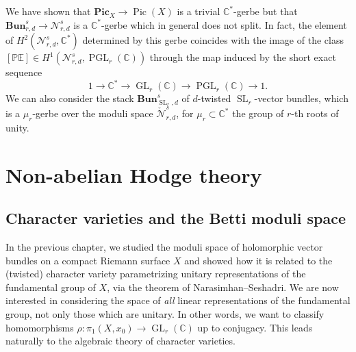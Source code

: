 \documentclass[12pt,a4paper]{amsbook}
\theoremstyle{remark} \newtheorem{rmk}[thm]{Remark}
\theoremstyle{definition} \newtheorem{defn}[thm]{Definition}
\theoremstyle{definition} \newtheorem{ex}[thm]{Example}
\theoremstyle{definition} \newtheorem{ej}{Exercise}
\newcommand{\C}{\mathbb C}
\newcommand{\bbE}{\mathbb E}
\newcommand{\bbP}{\mathbb P}
\newcommand{\cN}{\mathcal N}
\DeclareMathOperator{\Pic}{Pic}
\DeclareMathOperator{\GL}{GL}
\DeclareMathOperator{\SL}{SL}
\DeclareMathOperator{\PGL}{PGL}
\begin{document}
We have shown that $\mathbf{Pic}_X\rightarrow \Pic(X)$ is a trivial $\C^*$-gerbe but that $\mathbf{Bun}_{r,d}^s \rightarrow \cN^s_{r,d}$ is a $\C^*$-gerbe which in general does not split. In fact, the element of $H^2(\cN^s_{r,d},\C^*)$ determined by this gerbe coincides with the image of the class $[\bbP \bbE] \in H^1(\cN^s_{r,d},\PGL_r(\C))$ through the map induced by the short exact sequence \[1\rightarrow \C^* \rightarrow \GL_r(\C) \rightarrow \PGL_r(\C) \rightarrow 1.\]
We can also consider the stack $\mathbf{Bun}_{\SL_r,d}^s$ of $d$-twisted $\SL_r$-vector bundles, which is a $\mu_r$-gerbe over the moduli space $\check{\cN}^s_{r,d}$, for $\mu_r\subset \C^*$ the group of $r$-th roots of unity.

\chapter{Non-abelian Hodge theory} \label{sec:naht}
\section{Character varieties and the Betti moduli space} \label{ss:charactervarieties}
In the previous chapter, we studied the moduli space of holomorphic vector bundles on a compact Riemann surface $X$ and showed how it is related to the (twisted) character variety parametrizing unitary representations of the fundamental group of $X$, via the theorem of Narasimhan--Seshadri. We are now interested in considering the space of \textit{all} linear representations of the fundamental group, not only those which are unitary. In other words, we want to classify homomorphisms $\rho:\pi_1(X,x_0)\rightarrow \GL_r(\C)$ up to conjugacy. This leads naturally to the algebraic theory of character varieties.
\end{document}
